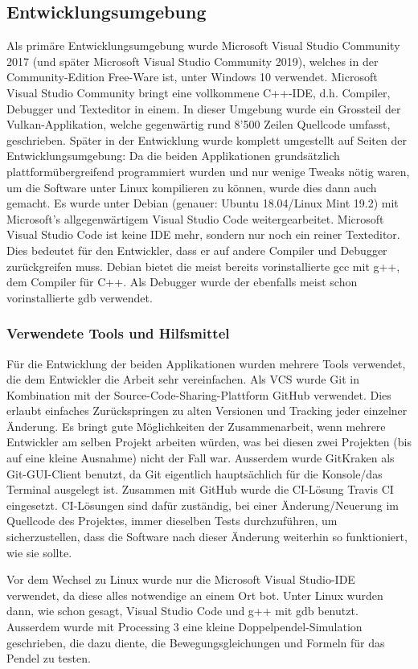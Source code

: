 \documentclass[titlepage, 11pt, a4paper, ngerman]{article}
\begin{document}
\subsection{Entwicklungsumgebung}
Als primäre Entwicklungsumgebung wurde Microsoft Visual Studio Community 2017 (und später Microsoft Visual Studio Community 2019), welches in der Community-Edition Free-Ware ist, unter Windows 10 verwendet. Microsoft Visual Studio Community bringt eine vollkommene C++-\acrshort{IDE}, d.h. \gls{Compiler}, \gls{Debugger} und \gls{Texteditor} in einem. In dieser Umgebung wurde ein Grossteil der Vulkan-Applikation, welche gegenwärtig rund 8'500 Zeilen Quellcode umfasst, geschrieben. Später in der Entwicklung wurde komplett umgestellt auf Seiten der Entwicklungsumgebung: Da die beiden Applikationen grundsätzlich plattformübergreifend programmiert wurden und nur wenige \glspl{Tweak} nötig waren, um die Software unter \gls{Linux} kompilieren zu können, wurde dies dann auch gemacht. Es wurde unter \gls{Debian} (genauer: Ubuntu 18.04/\gls{Linux} Mint 19.2) mit Microsoft's allgegenwärtigem Visual Studio Code weitergearbeitet. Microsoft Visual Studio Code ist keine \acrfull{IDE} mehr, sondern nur noch ein reiner \gls{Texteditor}. Dies bedeutet für den Entwickler, dass er auf andere \gls{Compiler} und \gls{Debugger} zurückgreifen muss. \gls{Debian} bietet die meist bereits vorinstallierte \acrfull{gcc} mit g++, dem \gls{Compiler} für C++. Als \gls{Debugger} wurde der ebenfalls meist schon vorinstallierte \acrfull{gdb} verwendet.

\subsubsection{Verwendete Tools und Hilfsmittel}
Für die Entwicklung der beiden Applikationen wurden mehrere \glspl{Tool} verwendet, die dem Entwickler die Arbeit sehr vereinfachen. Als \acrfull{VCS} wurde Git in Kombination mit der Source-Code-Sharing-Plattform \gls{GitHub} verwendet. Dies erlaubt einfaches Zurückspringen zu alten Versionen und \gls{Tracking} jeder einzelner Änderung. Es bringt gute Möglichkeiten der Zusammenarbeit, wenn mehrere Entwickler am selben Projekt arbeiten würden, was bei diesen zwei Projekten (bis auf eine kleine Ausnahme) nicht der Fall war. Ausserdem wurde GitKraken als Git-\acrshort{GUI}-Client benutzt, da Git eigentlich hauptsächlich für die Konsole/das Terminal ausgelegt ist. Zusammen mit \gls{GitHub} wurde die \acrfull{CI}-Lösung Travis \acrshort{CI} eingesetzt. \acrshort{CI}-Lösungen sind dafür zuständig, bei einer Änderung/Neuerung im Quellcode des Projektes, immer dieselben Tests durchzuführen, um sicherzustellen, dass die Software nach dieser Änderung weiterhin so funktioniert, wie sie sollte.\par
Vor dem Wechsel zu \gls{Linux} wurde nur die Microsoft Visual Studio-\acrshort{IDE} verwendet, da diese alles notwendige an einem Ort bot. Unter \gls{Linux} wurden dann, wie schon gesagt, Visual Studio Code und g++ mit \acrshort{gdb} benutzt. Ausserdem wurde mit Processing 3 eine kleine Doppelpendel-Simulation geschrieben, die dazu diente, die Bewegungsgleichungen und Formeln für das Pendel zu testen.
\end{document}
